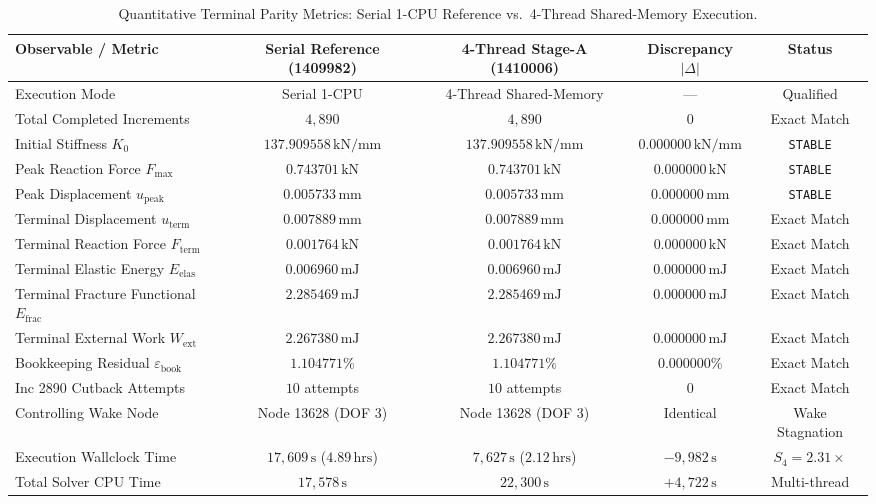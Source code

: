\begin{table}[htbp]
\centering
\small
\caption{Quantitative Terminal Parity Metrics: Serial 1-CPU Reference vs.\ 4-Thread Shared-Memory Execution.}
\label{tab:stage14uaj_terminal_parity_metrics}
\begin{tabularx}{\textwidth}{l c c c c}
\toprule
\textbf{Observable / Metric} & \textbf{Serial Reference (1409982)} & \textbf{4-Thread Stage-A (1410006)} & \textbf{Discrepancy $|\Delta|$} & \textbf{Status} \\
\midrule
Execution Mode & Serial 1-CPU & 4-Thread Shared-Memory & --- & Qualified \\
Total Completed Increments & $4{,}890$ & $4{,}890$ & $0$ & Exact Match \\
Initial Stiffness $K_0$ & $137.909558\,\mathrm{kN/mm}$ & $137.909558\,\mathrm{kN/mm}$ & $0.000000\,\mathrm{kN/mm}$ & \texttt{STABLE} \\
Peak Reaction Force $F_{\max}$ & $0.743701\,\mathrm{kN}$ & $0.743701\,\mathrm{kN}$ & $0.000000\,\mathrm{kN}$ & \texttt{STABLE} \\
Peak Displacement $u_{\mathrm{peak}}$ & $0.005733\,\mathrm{mm}$ & $0.005733\,\mathrm{mm}$ & $0.000000\,\mathrm{mm}$ & \texttt{STABLE} \\
Terminal Displacement $u_{\text{term}}$ & $0.007889\,\mathrm{mm}$ & $0.007889\,\mathrm{mm}$ & $0.000000\,\mathrm{mm}$ & Exact Match \\
Terminal Reaction Force $F_{\text{term}}$ & $0.001764\,\mathrm{kN}$ & $0.001764\,\mathrm{kN}$ & $0.000000\,\mathrm{kN}$ & Exact Match \\
Terminal Elastic Energy $E_{\mathrm{elas}}$ & $0.006960\,\mathrm{mJ}$ & $0.006960\,\mathrm{mJ}$ & $0.000000\,\mathrm{mJ}$ & Exact Match \\
Terminal Fracture Functional $E_{\mathrm{frac}}$ & $2.285469\,\mathrm{mJ}$ & $2.285469\,\mathrm{mJ}$ & $0.000000\,\mathrm{mJ}$ & Exact Match \\
Terminal External Work $W_{\mathrm{ext}}$ & $2.267380\,\mathrm{mJ}$ & $2.267380\,\mathrm{mJ}$ & $0.000000\,\mathrm{mJ}$ & Exact Match \\
Bookkeeping Residual $\varepsilon_{\mathrm{book}}$ & $1.104771\%$ & $1.104771\%$ & $0.000000\%$ & Exact Match \\
Inc 2890 Cutback Attempts & $10$ attempts & $10$ attempts & $0$ & Exact Match \\
Controlling Wake Node & Node 13628 (DOF 3) & Node 13628 (DOF 3) & Identical & Wake Stagnation \\
Execution Wallclock Time & $17{,}609\,\mathrm{s}$ ($4.89\,\mathrm{hrs}$) & $7{,}627\,\mathrm{s}$ ($2.12\,\mathrm{hrs}$) & $-9{,}982\,\mathrm{s}$ & $S_4 = 2.31\times$ \\
Total Solver CPU Time & $17{,}578\,\mathrm{s}$ & $22{,}300\,\mathrm{s}$ & $+4{,}722\,\mathrm{s}$ & Multi-thread \\
\bottomrule
\end{tabularx}
\end{table}


